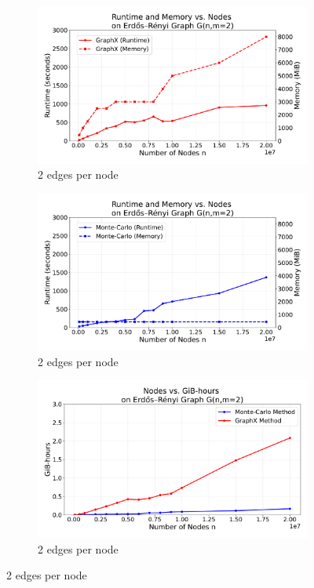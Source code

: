 \begin{figure}[H]
    \centering
    \begin{subfigure}[t]{0.75\linewidth}
        \centering
        \includegraphics[width=\linewidth]{images/plots/ER_2edg/combined_runtime_memory_vs_nodes_2edges_v3.pdf}
        \caption{2 edges per node}
        \label{fig:2run}
    \end{subfigure}\hfill
    \begin{subfigure}[t]{0.75\linewidth}
        \centering
        \includegraphics[width=\linewidth]{images/plots/ER_2edg/combined_runtime_memory_vs_nodes_2edges_mc.pdf}
        \caption{2 edges per node}
        \label{fig:2cost}
    \end{subfigure}
    \begin{subfigure}[t]{0.75\linewidth}
        \centering
        \includegraphics[width=\linewidth]{images/plots/ER_2edg/gbhrs_nodes_er_graph_2edges.pdf}
        \caption{2 edges per node}
        \label{fig:2cost}
    \end{subfigure}
\end{figure}
